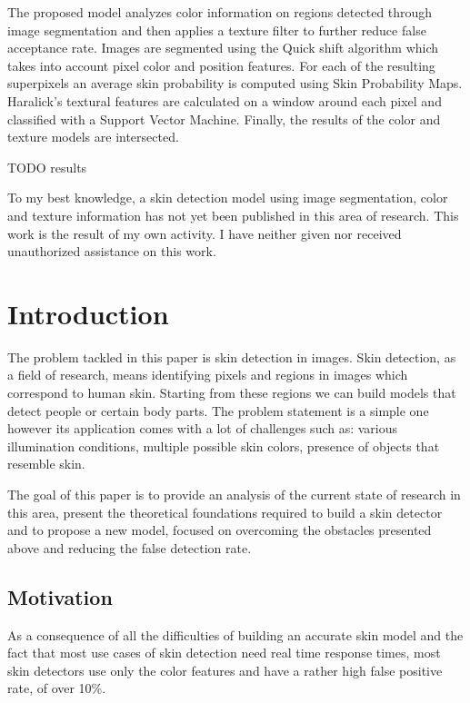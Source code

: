 \documentclass[12pt]{report}
\begin{document}
	The proposed model analyzes color information on regions detected through image segmentation and then applies a texture filter to further reduce false acceptance rate. Images are segmented using the Quick shift algorithm which takes into account pixel color and position features. For each of the resulting superpixels an average skin probability is computed using Skin Probability Maps. Haralick's textural features are calculated on a window around each pixel and classified with a Support Vector Machine. Finally, the results of the color and texture models are intersected. 
	
	TODO results
	
	To my best knowledge, a skin detection model using image segmentation, color and texture information has not yet been published in this area of research. This work is the result of my own activity. I have neither given nor received unauthorized assistance on this work.
	
	
	\tableofcontents
	\listoffigures
	\listoftables
	\newpage
	
	
	\chapter{Introduction}
	
	The problem tackled in this paper is skin detection in images. Skin detection, as a field of research,  means identifying pixels and regions in images which correspond to human skin. Starting from these regions we can build models that detect people or certain body parts. The problem statement is a simple one however its application comes with a lot of challenges such as: various illumination conditions, multiple possible skin colors, presence of objects that resemble skin.
	
	The goal of this paper is to provide an analysis of the current state of research in this area, present the theoretical foundations required to build a skin detector and to propose a new model, focused on overcoming the obstacles presented above and reducing the false detection rate.
	
	\section{Motivation}
	As a consequence of all the difficulties of building an accurate skin model and the fact that most use cases of skin detection need real time response times, most skin detectors use only the color features and have a rather high false positive rate, of over 10\%\cite{survey_skin_color_modeling}. 
	
\end{document}
